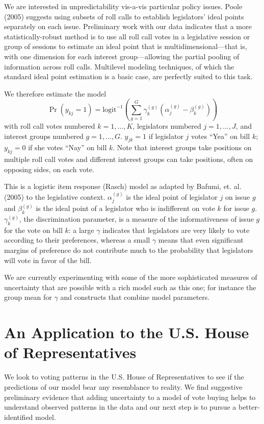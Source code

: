 \documentclass[12pt]{article}
\newcommand{\ga}{\gamma}
\begin{document}
We are interested in unpredictability vis-a-vis particular policy issues. Poole (2005) suggests using subsets of roll calls to establish legislators' ideal points separately on each issue. Preliminary work with our data indicates that a more statistically-robust method is to use all roll call votes in a legislative session or group of sessions to estimate an ideal point that is multidimensional---that is, with one dimension for each interest group---allowing the partial pooling of information across roll calls. Multilevel modeling techniques, of which the standard ideal point estimation is a basic case, are perfectly suited to this task.

We therefore estimate the model
\begin{equation}
  \Pr(y_{kj} = 1) = \text{logit}^{-1}\left( \sum_{g=1}^G \ga_k^{(g)}\left( \alpha_j^{(g)} - \beta_k^{(g)}\right) \right)
	\label{eq:v2}
\end{equation}
with roll call votes numbered $k=1,\ldots,K$, legislators numbered $j=1,\dots,J$, and interest groups numbered $g=1,\dots,G$. $y_{jk}=1$ if legislator $j$ votes ``Yea'' on bill $k$; $y_{kj}=0$ if she votes ``Nay'' on bill $k$. Note that interest groups take positions on multiple roll call votes and different interest groups can take positions, often on opposing sides, on each vote.
		
This is a logistic item response (Rasch) model as adapted by Bafumi, et. al. (2005) to the legislative context. $\alpha_j^{(g)}$ is the ideal point of legislator $j$ on issue $g$ and $\beta_k^{(g)}$ is the ideal point of a legislator who is indifferent on vote $k$ for issue $g$. $\gamma_k^{(g)}$, the discrimination parameter, is a measure of the informativeness of issue $g$ for the vote on bill $k$: a large $\ga$ indicates that legislators are very likely to vote according to their preferences, whereas a small $\ga$ means that even significant margins of preference do not contribute much to the probability that legislators will vote in favor of the bill.

We are currently experimenting with some of the more sophisticated measures of uncertainty that are possible with a rich model such as this one; for instance the group mean for $\ga$ and constructs that combine model parameters.


\section{An Application to the U.S. House of Representatives}
\label{sec:house}
We look to voting patterns in the U.S. House of Representatives to see if the predictions of our model bear any resemblance to reality. We find suggestive preliminary evidence that adding uncertainty to a model of vote buying helps to understand observed patterns in the data and our next step is to pursue a better-identified model.
\end{document}
